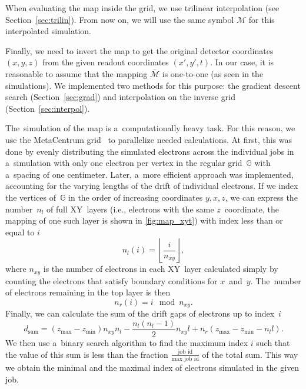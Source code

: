 		When evaluating the map inside the grid, we use trilinear interpolation (see Section~\ref{sec:trilin}). From now on, we will use the same symbol $\mathcal{M}$ for this interpolated simulation.
		
		Finally, we need to invert the map to get the original detector coordinates $(x,y,z)$ from the given readout coordinates $(x',y',t)$. In our case, it is reasonable to assume that the mapping $\overline{\mathcal{M}}$ is one-to-one (as seen in the simulations). We implemented two methods for this purpose: the gradient descent search (Section~\ref{sec:grad}) and interpolation on the inverse grid (Section~\ref{sec:interpol}).
		
		The~simulation of the map is a~computationally heavy task. For this reason, we use the MetaCentrum grid~\cite{metacentrum} to parallelize needed calculations. At first, this was done by evenly distributing the simulated electrons across the individual jobs in a~simulation with only one electron per vertex in the regular grid~$\mathbb{G}$ with a~spacing of one centimeter. Later, a~more efficient approach was implemented, accounting for the varying lengths of the drift of individual electrons. If we index the vertices of~$\mathbb{G}$ in the order of increasing coordinates $y,x,z$, we can express the number~$n_l$ of full XY~layers (i.e., electrons with the same $z$~coordinate, the mapping of one such layer is shown in \cref{fig:map_xyt}) with index less than or equal to $i$
			\begin{equation}
				n_l(i) = \left\lfloor\frac{i}{n_{xy}}\right\rfloor,
			\end{equation}
		where $n_{xy}$ is the number of electrons in each XY~layer calculated simply by counting the electrons that satisfy boundary conditions for $x$~and~$y$. The~number of electrons remaining in the top layer is then
			\begin{equation}
				n_r(i) = i\!\!\!\!\mod n_{xy}.
			\end{equation}
		Finally, we can calculate the sum of the drift gaps of electrons up to index~$i$
			\begin{equation}
				d_\text{sum} = (z_\text{max}-z_\text{min})n_{xy}n_l-\frac{n_l(n_l-1)}{2}n_{xy}l+n_r(z_\text{max}-z_\text{min}-n_l l).
			\end{equation}
		We then use a~binary search algorithm to find the maximum index $i$ such that the value of this sum is less than the fraction $\frac{\text{job id}}{\text{max job id}}$ of the total sum. This way we obtain the minimal and the maximal index of electrons simulated in the given job.
		
